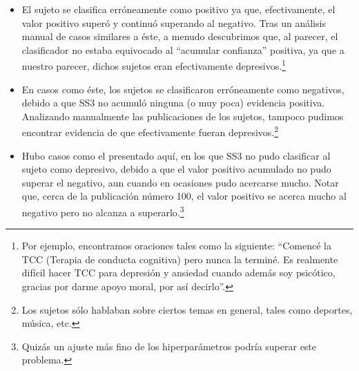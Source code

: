 \begin{itemize}
\item[(a)]
El sujeto se clasifica erróneamente como positivo ya que, efectivamente, el valor positivo superó y continuó superando al negativo. Tras un análisis manual de casos similares a éste, a menudo descubrimos que, al parecer, el clasificador no estaba equivocado al ``acumular confianza'' positiva, ya que a nuestro parecer, dichos sujetos eran efectivamente depresivos.\footnote{Por ejemplo, encontramos oraciones tales como la siguiente: ``Comencé la TCC (Terapia de conducta cognitiva) pero nunca la terminé. Es realmente difícil hacer TCC para depresión y ansiedad cuando además soy psicótico, gracias por darme apoyo moral, por así decirlo''.}
\item[(b)]
En casos como éste, los sujetos se clasificaron erróneamente como negativos, debido a que SS3 no acumuló ninguna (o muy poca) evidencia positiva. Analizando manualmente las publicaciones de los sujetos, tampoco pudimos encontrar evidencia de que efectivamente fueran depresivos.\footnote{Los sujetos sólo hablaban sobre ciertos temas en general, tales como deportes, música, etc.}
\item[(c)]
Hubo casos como el presentado aquí, en los que SS3 no pudo clasificar al sujeto como  depresivo,  debido a que el valor positivo acumulado no pudo superar el negativo, aun cuando en ocasiones pudo acercarse mucho. Notar que, cerca de la publicación número 100, el valor positivo se acerca mucho al negativo pero no alcanza a superarlo.\footnote{Quizás un ajuste más fino de los hiperparámetros podría superar este problema.}

\end{itemize}
